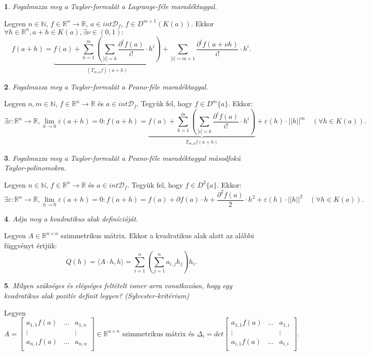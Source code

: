 \documentclass[a4paper]{article}
\def\R{\mathbb{R}}
\def\N{\mathbb{N}}
\theoremstyle{qstyle}
\newtheorem{question}{}{}
\begin{document}
	\begin{question}
		Fogalmazza meg a Taylor-formulát a Lagrange-féle maradéktaggal.   
	\end{question}
	Legyen $n \in \N$, $f \in \R^n \to \R$, $a \in int\mathcal{D}_{f}$, $f \in D^{m+1}(K(a))$. Ekkor $\forall h \in \R^n, a+h \in K(a), \exists \mathcal{\nu} \in (0,1) :$
	$$f(a+h) = \underbrace{f(a) + \sum_{k=1}^{m}\left(\sum_{|i|=k}\frac{\partial^i f(a)}{i!} \cdot h^i\right)}_{(T_{m,a} f)(a+h)} + \sum_{|i|=m+1}\frac{\partial^i f(a+\mathcal{\nu}h)}{i!}\cdot h^i\text{.}$$
	
	\newpage
	
	\begin{question}
		Fogalmazza meg a Taylor-formulát a Peano-féle maradéktaggal.  
	\end{question}
	Legyen $n,m \in \N$, $f \in \R^{n} \to \R$ és $a \in int\mathcal{D}_{f}$. Tegyük fel, hogy $f \in D^{m}\{a\}$. Ekkor:
	$$\exists \varepsilon : \R^n \to \R, \lim\limits_{h \to 0}\varepsilon(a+h) = 0 : f(a+h) = \underbrace{f(a)+\sum_{k=1}^{m}\left(\sum_{|i|=k}^{}\frac{\partial^i f(a)}{i!}\cdot h^i\right)}_{T_{m,a}f(a+h)} + \varepsilon(h) \cdot ||h||^m \quad (\forall h \in K(a))\text{.}$$
	
	\begin{question}
		Fogalmazza meg a Taylor-formulát a Peano-féle maradéktaggal másodfokú Taylor-polinomokra. 
	\end{question}
	Legyen $n \in \N$, $f \in \R^{n} \to \R$ és $a \in int\mathcal{D}_{f}$. Tegyük fel, hogy $f \in D^{2}\{a\}$. Ekkor:
	$$\exists \varepsilon : \R^n \to \R, \lim\limits_{h \to 0}\varepsilon(a+h) = 0 : f(a+h) = f(a) + \partial{f(a)} \cdot h + \frac{\partial^2 f(a)}{2} \cdot h^2 + \varepsilon(h) \cdot ||h||^2 \quad (\forall h \in K(a))\text{.}$$
	
	\begin{question}
		Adja meg a kvadratikus alak definícióját.  
	\end{question}
	Legyen $A \in \R^{n \times n}$ szimmetrikus mátrix. Ekkor a kvadratikus alak alatt az alábbi függvényt értjük:
	$$Q(h) = \langle{A \cdot h, h}\rangle = \sum_{i=1}^{n}\left(\sum_{j=1}^{n}a_{i,j}h_j\right)h_i \text{.}$$ 
	
	\begin{question}
		Milyen szükséges és elégséges feltételt ismer arra vonatkozóan, hogy egy kvadratikus alak pozitív definit legyen? (Sylvester-kritérium)   
	\end{question}
	Legyen
	$$A = \begin{bmatrix} 
	a_{1,1}f(a) & \dots & a_{1,n} \\
	\vdots &  & \vdots \\
	a_{n,1}f(a) & \dots & a_{n,n} \\
	\end{bmatrix} \in \R^{n \times n} \text{ szimmetrikus mátrix és } \Delta_i = det \begin{bmatrix} 
	a_{1,1}f(a) & \dots & a_{1,i} \\
	\vdots &  & \vdots \\
	a_{i,1}f(a) & \dots & a_{i,i} \\
	\end{bmatrix}\text{.}$$
	
\end{document}

